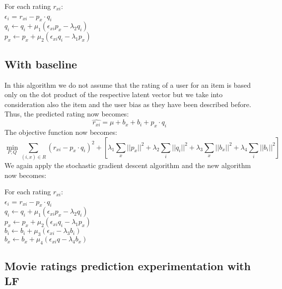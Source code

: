 \documentclass[a4paper]{article}
\begin{document}
For each rating $r_{xi}$: \\

$\epsilon_{i}$ = $r_{xi} -p_{x}\cdot q_{i}$ \\

$q_{i} \leftarrow q_{i} + \mu_1(\epsilon_{xi}p_{x} - \lambda_{2}q_{i})$ \\

$p_{x} \leftarrow p_{x} + \mu_2(\epsilon_{xi}q_{i} - \lambda_{1}p_{x})$


\subsection{With baseline}
In this algorithm we do not assume that the rating of a user for an item is based only on the dot product of the respective latent vector but we take into consideration also the item and the user bias as they have been described before. Thus, the predicted rating now becomes:
$$\hat{r_{xi}} = \mu + b_{x} + b_{i} + p_{x}\cdot q_{i}$$
The objective function now becomes: 
$$\min_{P, Q} \sum_{(i, x)\in R}(r_{xi} -p_{x}\cdot q_{i})^2 + [\lambda_{1}\sum_{x}||p_{x}||^2 + \lambda_{2}\sum_{i}||q_{i}||^2 + \lambda_{3}\sum_{x}||b_{x}||^2 + \lambda_{4}\sum_{i}||b_{i}||^2]$$
We again apply the stochastic gradient descent algorithm and the new algorithm now becomes:

For each rating $r_{xi}$: \\

$\epsilon_{i}$ = $r_{xi} -p_{x}\cdot q_{i}$ \\

$q_{i} \leftarrow q_{i} + \mu_1(\epsilon_{xi}p_{x} - \lambda_{2}q_{i})$ \\

$p_{x} \leftarrow p_{x} + \mu_2(\epsilon_{xi}q_{i} - \lambda_{1}p_{x})$ \\

$b_{i} \leftarrow b_{i} + \mu_3(\epsilon_{xi} - \lambda_{3}b_{i})$ \\

$b_{x} \leftarrow b_{x} + \mu_4(\epsilon_{xi}q - \lambda_{4}b_{x})$

\subsection{Movie ratings prediction experimentation with LF}
\end{document}

